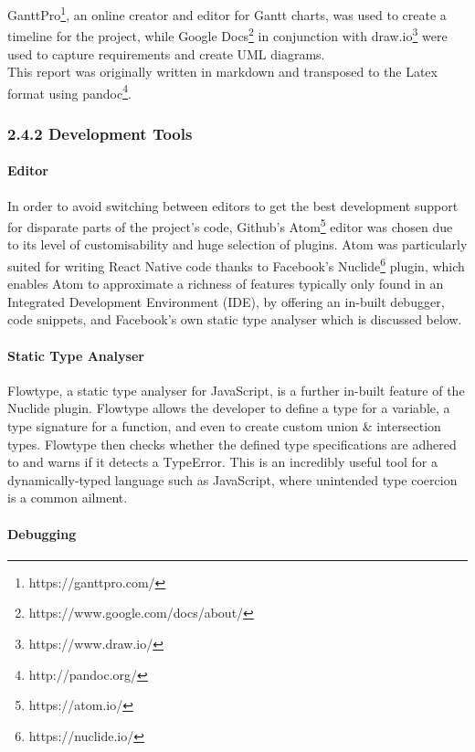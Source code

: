 \documentclass[12pt]{report}
\let\oldparagraph\paragraph
\renewcommand{\paragraph}[1]{\oldparagraph{#1}\mbox{}}
\begin{document}
GanttPro\footnote{https://ganttpro.com/}, an online creator and
editor for Gantt charts, was used to create a timeline for the project,
while Google Docs\footnote{https://www.google.com/docs/about/}
in conjunction with draw.io\footnote{https://www.draw.io/} were
used to capture requirements and create UML diagrams.\\
This report was originally written in markdown and transposed to the
Latex format using pandoc\footnote{http://pandoc.org/}.

\subsubsection{2.4.2 Development Tools}\label{development-tools}

\paragraph{Editor}\label{editor}

In order to avoid switching between editors to get the best development
support for disparate parts of the project's code, Github's
Atom\footnote{https://atom.io/} editor was chosen due to its level
of customisability and huge selection of plugins. Atom was particularly
suited for writing React Native code thanks to Facebook's
Nuclide\footnote{https://nuclide.io/} plugin, which enables Atom
to approximate a richness of features typically only found in an
Integrated Development Environment (IDE), by offering an in-built
debugger, code snippets, and Facebook's own static type analyser which
is discussed below.

\paragraph{Static Type Analyser}\label{static-type-analyser}

Flowtype\cite{1flowtype}, a static type
analyser for JavaScript, is a further in-built feature of the Nuclide
plugin. Flowtype allows the developer to define a type for a variable, a
type signature for a function, and even to create custom union \&
intersection types. Flowtype then checks whether the defined type
specifications are adhered to and warns if it detects a TypeError. This
is an incredibly useful tool for a dynamically-typed language such as
JavaScript, where unintended type coercion is a common ailment.

\paragraph{Debugging}\label{debugging}
\end{document}

